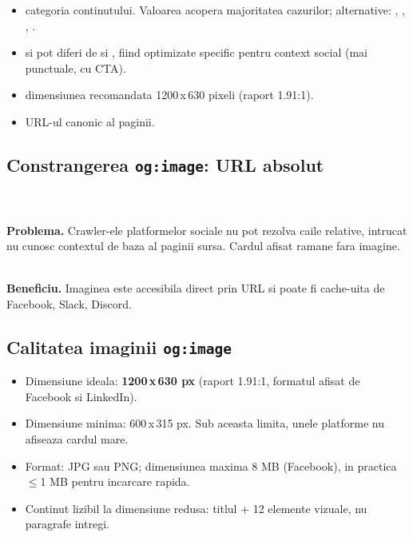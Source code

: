 \begin{itemize}
  \item {} \textendash{} categoria continutului. Valoarea  acopera majoritatea cazurilor; alternative: , , , .
  \item {} si  \textendash{} pot diferi de  si , fiind optimizate specific pentru context social (mai punctuale, cu CTA).
  \item {} \textendash{} dimensiunea recomandata 1200\,x\,630 pixeli (raport 1.91:1).
  \item {} \textendash{} URL-ul canonic al paginii.
\end{itemize}

\subsection{Constrangerea \texttt{og:image}: URL absolut}

\begin{dano}
\\
\\
\textbf{Problema.} Crawler-ele platformelor sociale nu pot rezolva caile relative, intrucat nu cunosc contextul de baza al paginii sursa. Cardul afisat ramane fara imagine.
\end{dano}

\begin{dado}
\\
\textbf{Beneficiu.} Imaginea este accesibila direct prin URL si poate fi cache-uita de Facebook, Slack, Discord.
\end{dado}

\subsection{Calitatea imaginii \texttt{og:image}}

\begin{itemize}[itemsep=2pt]
  \item Dimensiune ideala: \textbf{1200\,x\,630 px} (raport 1.91:1, formatul afisat de Facebook si LinkedIn).
  \item Dimensiune minima: 600\,x\,315 px. Sub aceasta limita, unele platforme nu afiseaza cardul mare.
  \item Format: JPG sau PNG; dimensiunea maxima 8 MB (Facebook), in practica $\leq$1 MB pentru incarcare rapida.
  \item Continut lizibil la dimensiune redusa: titlul + 1\textendash{}2 elemente vizuale, nu paragrafe intregi.
\end{itemize}


